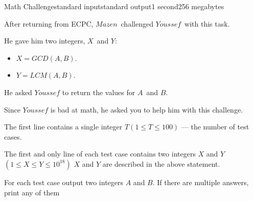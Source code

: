\begin{problem}{Math Challenge}{standard input}{standard output}{1 second}{256 megabytes}

After returning from ECPC, $Mazen$ challenged $Youssef$ with this task.

He gave him two integers, $X$ and $Y$:
\begin{itemize}
  \item $X = GCD(A,B)$.
  \item $Y = LCM(A,B)$.
\end{itemize}

He asked $Youssef$ to return the values for $A$ and $B$.

Since $Youssef$ is bad at math, he asked you to help him with this challenge.

\InputFile
The first line contains a single integer $T (1≤T≤100)$ --- the number of test cases.

The first and only line of each test case contains two integers $X$ and $Y$ $(1 \le X\le Y \le 10^{18})$ $X$ and $Y$ are described in the above statement.

\OutputFile
For each test case output two integers $A$ and $B$.
If there are multiple answers, print any of them

\Example

\begin{example}
%
\end{example}

\end{problem}

